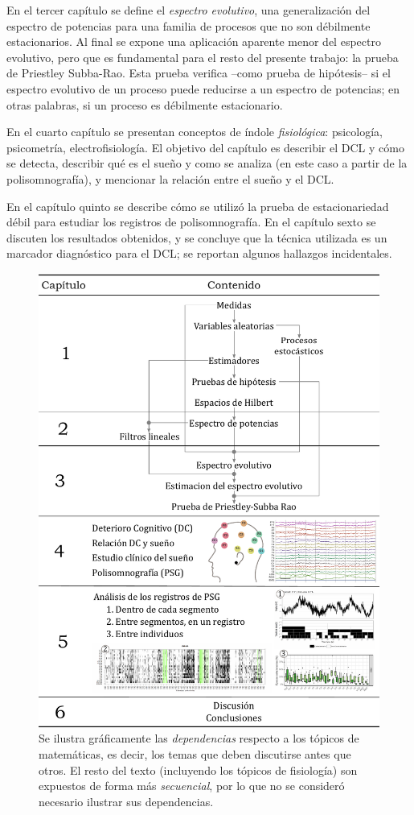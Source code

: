 \documentclass[12pt,letterpaper]{book}
\begin{document}
En el tercer capítulo se define el \textit{espectro evolutivo}, una generalización del espectro de potencias para una familia de procesos que no son débilmente estacionarios.
%
Al final se expone una aplicación aparente menor del espectro evolutivo, pero que es fundamental para el resto del presente trabajo: la prueba de Priestley Subba-Rao. 
%
Esta prueba verifica --como prueba de hipótesis-- si el espectro evolutivo de un proceso puede reducirse a un espectro de potencias; en otras palabras, si un proceso es débilmente estacionario.

En el cuarto capítulo se presentan conceptos de índole \textit{fisiológica}: psicología, psicometría, electrofisiología.
%
El objetivo del capítulo es describir el DCL y cómo se detecta, describir qué es el sueño y como se analiza (en este caso a partir de la polisomnografía), y mencionar la relación entre el sueño y el DCL.

En el capítulo quinto se describe cómo se utilizó la prueba de estacionariedad débil para estudiar los registros de polisomnografía.
%
En el capítulo sexto se discuten los resultados obtenidos, y se concluye que la técnica utilizada es un marcador diagnóstico para el DCL; se reportan algunos hallazgos incidentales.

\begin{figure}
\centering
\includegraphics[width=.9\textwidth]{./estructura_texto_v2.pdf}
\caption[Estructura de la tesis]{Se ilustra gráficamente las \textit{dependencias} respecto a los tópicos de matemáticas, es decir, los temas que deben discutirse antes que otros. El resto del texto (incluyendo los tópicos de fisiología) son expuestos de forma más \textit{secuencial}, por lo que no se consideró necesario ilustrar sus dependencias.}
\label{intro:estructura}
\end{figure}
\end{document}
